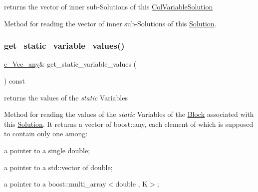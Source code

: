 returns the vector of inner sub-\/\+Solutions of this \mbox{\hyperlink{class_s_m_spp__di__unipi__it_1_1_col_variable_solution}{Col\+Variable\+Solution}} 

Method for reading the vector of inner sub-\/\+Solutions of this \mbox{\hyperlink{class_s_m_spp__di__unipi__it_1_1_solution}{Solution}}. \mbox{\label{class_s_m_spp__di__unipi__it_1_1_col_variable_solution_a99d0f17d8b6069fbaf8c5650ed14e573}} 
\subsubsection{\texorpdfstring{get\+\_\+static\+\_\+variable\+\_\+values()}{get\_static\_variable\_values()}}
{\footnotesize\ttfamily \mbox{\hyperlink{group___s_m_s__types_gaa16aeddc7a50d64299ee0f8d9ca5dc7d}{c\+\_\+\+Vec\+\_\+any}}\& get\+\_\+static\+\_\+variable\+\_\+values (\begin{DoxyParamCaption}\item[{void}]{ }\end{DoxyParamCaption}) const\hspace{0.3cm}{\ttfamily [inline]}}



returns the values of the {\itshape static} Variables 

Method for reading the values of the {\itshape static} Variables of the \mbox{\hyperlink{class_s_m_spp__di__unipi__it_1_1_block}{Block}} associated with this \mbox{\hyperlink{class_s_m_spp__di__unipi__it_1_1_solution}{Solution}}. It returns a vector of boost\+::any, each element of which is supposed to contain only one among\+:


\begin{DoxyItemize}
\item a pointer to a single double;
\item a pointer to a std\+::vector of double;
\item a pointer to a boost\+::multi\+\_\+array$<$double , K$>$;
\end{DoxyItemize}

